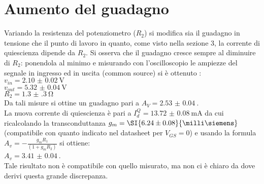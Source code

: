 \section{Aumento del guadagno}
Variando la resistenza del potenziometro ($R_2$) si modifica sia il guadagno in tensione che il punto di lavoro  in quanto, come visto nella sezione 3, la corrente di quiescienza dipende da $R_2$. Si osserva che il guadagno cresce sempre al diminuire di $R_2$: ponendola al minimo e misurando con l'oscilloscopio le ampiezze del segnale in ingresso ed in uscita (common source) si è ottenuto : \\
$v_{in}= \SI{2.10(2)}{\V}$\\
$v_{out}= \SI{5.32(4)}{\V}$\\
$R_2= \SI{1.3(3)}{\ohm}$\\
Da tali misure si ottine un guadagno pari a $A_V = \SI{2.53(4)}{}$. \\
La nuova corrente di quiescienza è pari a $I_d^{Q}= \SI{13.72(8)}{\mA}$ da cui ricalcolando la transconduttanza $g_m= \SI{6.24 \pm 0.08}{\milli\siemens}$ (compatibile con quanto indicato nel datasheet per $V_{GS}=0$) e usando la formula $A_v=-\frac{g_m R_1}{(1+g_m R_2)}$  si ottiene:\\
$A_v= \SI{3.41(4)}{}$.\\
Tale risultato non è compatibile con quello misurato, ma non ci è chiaro da dove derivi questa grande discrepanza.
